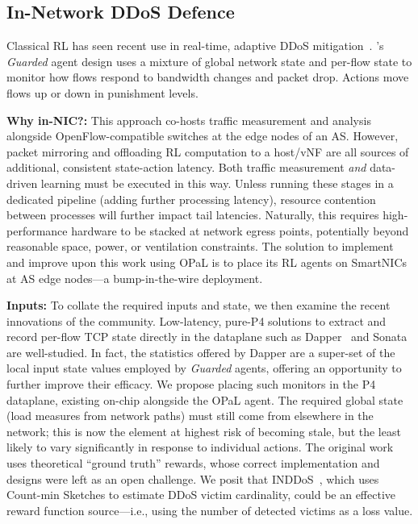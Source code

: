 \documentclass[
conference
,10pt
]{IEEEtran}
\newcommand{\fakepara}[1]{\noindent\textbf{#1:}}
\newcommand{\approachshort}{OPaL}
\begin{document}

\subsection{In-Network DDoS Defence}\label{sec:integ-1}
Classical RL has seen recent use in real-time, adaptive DDoS mitigation~\parencite{DBLP:journals/tnsm/SimpsonRP20}.
's \emph{Guarded} agent design uses a mixture of global network state and per-flow state to monitor how flows respond to bandwidth changes and packet drop.
Actions move flows up or down in punishment levels.

\fakepara{Why in-NIC?}
This approach co-hosts traffic measurement and analysis alongside OpenFlow-compatible switches at the edge nodes of an AS.
However, packet mirroring and offloading RL computation to a host/vNF are all sources of additional, consistent state-action latency.
Both traffic measurement \emph{and} data-driven learning must be executed in this way.
Unless running these stages in a dedicated pipeline (adding further processing latency), resource contention between processes will further impact tail latencies.
Naturally, this requires high-performance hardware to be stacked at network egress points, potentially beyond reasonable space, power, or ventilation constraints.
The solution to implement and improve upon this work using \approachshort{} is to place its RL agents on SmartNICs at AS edge nodes---a bump-in-the-wire deployment.


\fakepara{Inputs}
To collate the required inputs and state, we then examine the recent innovations of the community.
Low-latency, pure-P4 solutions to extract and record per-flow TCP state directly in the dataplane such as Dapper~\parencite{DBLP:conf/sosr/GhasemiBR17} and Sonata~\parencite{DBLP:conf/sigcomm/GuptaHCFRW18} are well-studied.
In fact, the statistics offered by Dapper are a super-set of the local input state values employed by \emph{Guarded} agents, offering an opportunity to further improve their efficacy. 
We propose placing such monitors in the P4 dataplane, existing on-chip alongside the \approachshort{} agent.
The required global state (load measures from network paths) must still come from elsewhere in the network; this is now the element at highest risk of becoming stale, but the least likely to vary significantly in response to individual actions.
The original work uses theoretical ``ground truth'' rewards, whose correct implementation and designs were left as an open challenge. 
We posit that INDDoS~\parencite{tnms-ddos-victim-ident}, which uses Count-min Sketches to estimate DDoS victim cardinality, could be an effective reward function source---i.e., using the number of detected victims as a loss value.
\end{document}
